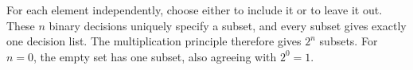 For each element independently, choose either to include it or to leave it out. These $n$ binary decisions uniquely specify a subset, and every subset gives exactly one decision list. The multiplication principle therefore gives $\boxed{2^n}$ subsets. For $n=0$, the empty set has one subset, also agreeing with $2^0=1$.
